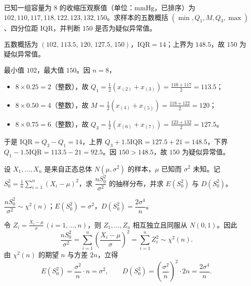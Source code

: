 \begin{exercise}
已知一组容量为 $8$ 的收缩压观察值（单位：$\mathrm{mmHg}$，已排序）为 $102,110,117,118,122,123,132,150$。求样本的五数概括 $(\min,Q_1,M,Q_3,\max)$、四分位距 $\mathrm{IQR}$，并判断 $150$ 是否为疑似异常值。
\begin{answer}
五数概括为 $(102,\,113.5,\,120,\,127.5,\,150)$，$\mathrm{IQR}=14$；上界为 $148.5$，故 $150$ 为疑似异常值。
\end{answer}
\begin{solution}
最小值 $102$，最大值 $150$。因 $n=8$，
\begin{itemize}
  \item $8\times 0.25=2$（整数），故 $Q_1=\frac{1}{2}(x_{(2)}+x_{(3)})=\frac{110+117}{2}=113.5$；
  \item $8\times 0.50=4$（整数），故 $M=\frac{1}{2}(x_{(4)}+x_{(5)})=\frac{118+122}{2}=120$；
  \item $8\times 0.75=6$（整数），故 $Q_3=\frac{1}{2}(x_{(6)}+x_{(7)})=\frac{123+132}{2}=127.5$。
\end{itemize}
于是 $\mathrm{IQR}=Q_3-Q_1=14$，上界 $Q_3+1.5\mathrm{IQR}=127.5+21=148.5$，下界 $Q_1-1.5\mathrm{IQR}=113.5-21=92.5$。因 $150>148.5$，故 $150$ 为疑似异常值。
\end{solution}
\end{exercise}

\begin{exercise}
设 $X_1,\ldots,X_n$ 是来自正态总体 $N(\mu,\sigma^2)$ 的样本，$\mu$ 已知而 $\sigma^2$ 未知。记 $S_0^2=\frac{1}{n}\sum_{i=1}^{n}(X_i-\mu)^2$，求 $\dfrac{nS_0^2}{\sigma^2}$ 的抽样分布，并求 $E(S_0^2)$ 与 $D(S_0^2)$。
\begin{answer}
$\dfrac{nS_0^2}{\sigma^2}\sim\chi^2(n)$；$E(S_0^2)=\sigma^2$，$D(S_0^2)=\dfrac{2\sigma^4}{n}$。
\end{answer}
\begin{solution}
令 $Z_i=\frac{X_i-\mu}{\sigma}\,(i=1,\ldots,n)$，则 $Z_1,\ldots,Z_n$ 相互独立且同服从 $N(0,1)$。因此
\[
  \frac{nS_0^2}{\sigma^2}=\sum_{i=1}^{n}\left(\frac{X_i-\mu}{\sigma}\right)^2=\sum_{i=1}^{n}Z_i^2\sim\chi^2(n).
\]
由 $\chi^2(n)$ 的期望 $n$ 与方差 $2n$，立得
\[
  E(S_0^2)=\frac{\sigma^2}{n}\cdot n=\sigma^2,\qquad
  D(S_0^2)=\left(\frac{\sigma^2}{n}\right)^2\cdot 2n=\frac{2\sigma^4}{n}.
\]
\end{solution}
\end{exercise}

